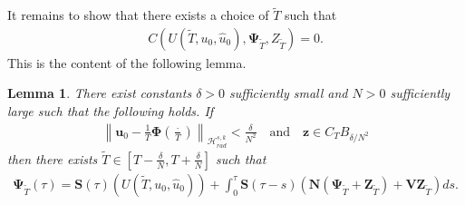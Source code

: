 \documentclass[12pt,reqno]{amsart}
\theoremstyle{plain}
\theoremstyle{remark}
\theoremstyle{plain}
\newtheorem{lemma}[theorem]{Lemma}
\theoremstyle{definition}
\numberwithin{equation}{section}
\numberwithin{equation}{section}
\newcommand{\norm}[1]{\left\|#1\right\|}
\newcommand{\HH}{\mathcal{H}}
\begin{document}
	It remains to show that there exists a choice of $\tilde{T}$ such that \begin{align*}
	    C(U(\tilde{T}, u_0, \hat{u}_0),\mathbf{\Psi}_{\tilde{T}},Z_{\tilde{T}})=0.
	\end{align*} This is the content of the following lemma.
	\begin{lemma}\label{no_corrector}
		There exist constants $\delta>0 $ sufficiently small and $N>0$ sufficiently large such that the following holds. If \begin{align*}
		    \norm{\mathbf{u}_0-\frac{1}{T}\mathbf{\Phi}\left(\frac{\cdot}{T}\right)}_{\HH_{rad}^{s,k}}<\frac{\delta}{N^2} \quad \text{and} \quad \mathbf{z}\in C_{T}B_{\delta/N^2}
		\end{align*} then there exists $\tilde{T}\in [T-\frac{\delta}{N},T+\frac{\delta}{N}]$ such that  
		\begin{align*}
			\mathbf{\Psi}_{\tilde{T}}(\tau)=\mathbf{S}(\tau)\left(U(\tilde{T}, u_0, \hat{u}_0)\right)  
			+\int_0^\tau \mathbf{S}(\tau-s)\left(\mathbf{N}(\mathbf{\Psi}_{\tilde{T}}+\mathbf{Z}_{\tilde{T}})+\mathbf{V}\mathbf{Z}_{\tilde{T}}\right) ds.
		\end{align*}
	\end{lemma}
\end{document}
